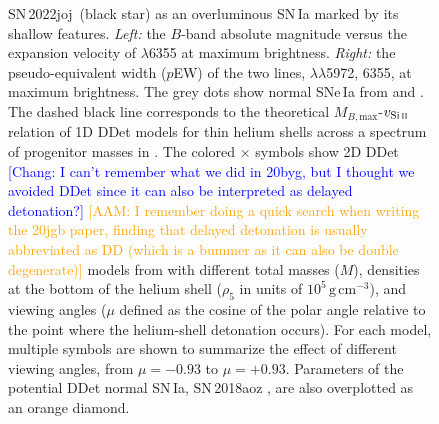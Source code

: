 \documentclass[twocolumn]{aastex631}
\newcommand{\sn}{SN\,2022joj}
\newcommand{\adam}[1]{\textcolor{orange}{[AAM: #1]}}
\newcommand{\chang}[1]{\textcolor{blue}{[Chang: #1]}}
\begin{document}
\begin{CJK*}{UTF8}{gbsn}
\begin{figure}
    \caption{\sn\ (black star) as an overluminous SN\,Ia marked by its shallow  features. \textit{Left:} the $B$-band absolute magnitude versus the expansion velocity of  $\lambda$6355 at maximum brightness. \textit{Right:} the pseudo-equivalent width ($p$EW) of the two  lines,  $\lambda\lambda$5972, 6355, at maximum brightness. The grey dots show normal SNe\,Ia from \citet{Zheng_2018} and \citet{Burrow_2020}. The dashed black line corresponds to the theoretical $M_{B,\mathrm{max}}$-$v_\mathrm{Si\,\textsc{ii}}$ relation of 1D DDet models for thin helium shells across a spectrum of progenitor masses in \citet{polin_observational_2019}. The colored $\times$ symbols show 2D DDet \chang{I can't remember what we did in 20byg, but I thought we avoided DDet since it can also be interpreted as delayed detonation?} \adam{I remember doing a quick search when writing the 20jgb paper, finding that delayed detonation is usually abbreviated as DD (which is a bummer as it can also be double degenerate)} models from \citet{Shen_2D_2021} with different total masses ($M$), densities at the bottom of the helium shell ($\rho_5$ in units of $10^{5}\,\mathrm{g\,cm^{-3}}$), and viewing angles ($\mu$ defined as the cosine of the polar angle relative to the point where the helium-shell detonation occurs). For each model, multiple symbols are shown to summarize the effect of different viewing angles, from $\mu = -0.93$ to $\mu=+0.93$. %
    Parameters of the potential DDet normal SN\,Ia, SN\,2018aoz \citep{Ni_18aoz_2023}, are also overplotted as an orange diamond.}
    \label{fig:phase_space}
\end{figure}


\end{CJK*}
\end{document}
